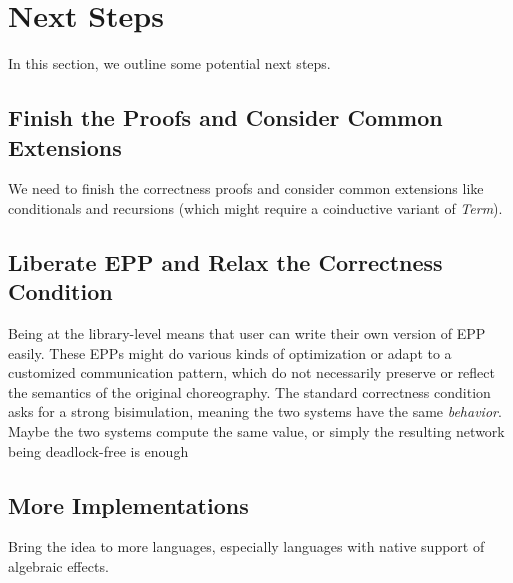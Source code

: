 \section{Next Steps}

In this section, we outline some potential next steps.

\subsection{Finish the Proofs and Consider Common Extensions}

We need to finish the correctness proofs and consider common extensions like conditionals and recursions (which might require a coinductive variant of \textit{Term}).

\subsection{Liberate EPP and Relax the Correctness Condition}

Being at the library-level means that user can write their own version of EPP easily.
%
These EPPs might do various kinds of optimization or adapt to a customized communication pattern, which do not necessarily preserve or reflect the semantics of the original choreography.
%
The standard correctness condition asks for a strong bisimulation, meaning the two systems have the same \emph{behavior}.
%
Maybe the two systems compute the same value, or simply the resulting network being deadlock-free is enough

\subsection{More Implementations}

Bring the idea to more languages, especially languages with native support of algebraic effects.
